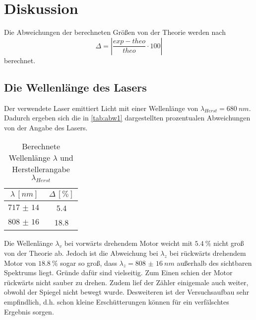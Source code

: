 \section{Diskussion}
\label{sec:Diskussion}
Die Abweichungen der berechneten Größen von der Theorie werden nach 
\begin{equation}\label{1}
    \Delta = |\frac{exp - theo}{theo} \cdot 100|
\end{equation}
berechnet.
\subsection{Die Wellenlänge des Lasers}
Der verwendete Laser emittiert Licht mit einer Wellenlänge von $\lambda_{Herst} = \SI{680}{nm}$. Dadurch ergeben sich die in \autoref{tab:abw1} dargestellten
prozentualen Abweichungen von der Angabe des Lasers.
\begin{table}[H]
    \centering
    \caption{Berechnete Wellenlänge $\lambda$ und Herstellerangabe $\lambda_{Herst}$}
    \begin{tabular}{c c}
        \toprule
        $\lambda \,[\unit{nm}]$ & $\Delta\,[\unit{\%}]$\\
        \midrule
        $\SI{717(14)}{}$ & 5.4\\
        $\SI{808(16)}{}$ & 18.8\\
        \bottomrule
    \end{tabular}
    \label{tab:abw1}
\end{table}
Die Wellenlänge $\lambda_v$ bei vorwärts drehendem Motor weicht mit $\SI{5.4}{\%}$ nicht groß von der Theorie ab. Jedoch ist die Abweichung bei $\lambda_z$ bei rückwärts
drehendem Motor von $\SI{18.8}{\%}$ sogar so groß, dass $\lambda_z = \SI{808(16)}{nm}$ außerhalb des sichtbaren Spektrums liegt.
Gründe dafür sind vielseitig. Zum Einen schien der Motor rückwärts nicht sauber zu drehen. Zudem lief der Zähler einigemale auch weiter, obwohl der Spiegel nicht bewegt wurde.
Desweiteren ist der Versuchsaufbau sehr empfindlich, d.h. schon kleine Erschütterungen können für ein verfälschtes Ergebnis sorgen.

